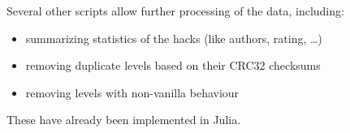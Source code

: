 Several other scripts allow further processing of the data, including:
\begin{itemize}
\item summarizing statistics of the hacks (like authors, rating,
  \dots)
\item removing duplicate levels based on their CRC32 checksums
\item removing levels with non-vanilla behaviour
\end{itemize}
These have already been implemented in Julia.


